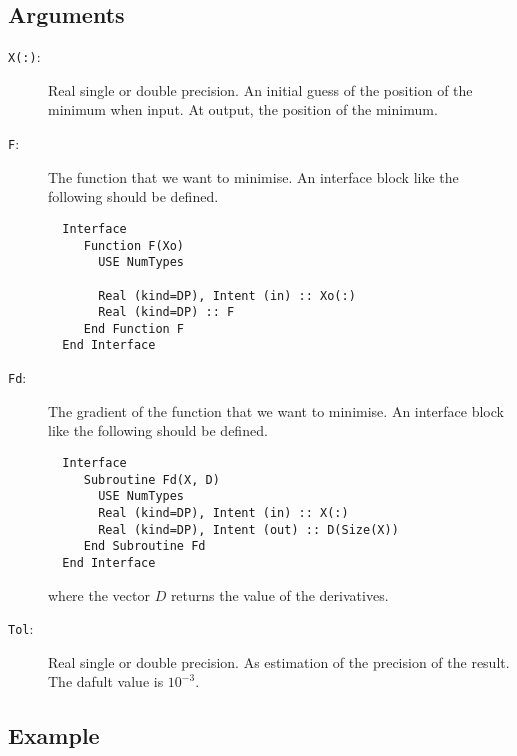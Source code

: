 \subsection{Arguments}

\begin{description}
\item[\texttt{X(:)}:] Real single or double precision. An initial guess
  of the position of the minimum when input. At output, the position
  of the minimum.
\item[\texttt{F}:]  The function that we want to minimise. 
  An interface block like the following should be defined.
\begin{verbatim}
  Interface
     Function F(Xo)
       USE NumTypes
       
       Real (kind=DP), Intent (in) :: Xo(:)
       Real (kind=DP) :: F
     End Function F
  End Interface
\end{verbatim}

\item[\texttt{Fd}:]  The gradient of the function that we want to minimise. 
  An interface block like the following should be defined.
\begin{verbatim}
  Interface 
     Subroutine Fd(X, D)
       USE NumTypes
       Real (kind=DP), Intent (in) :: X(:)
       Real (kind=DP), Intent (out) :: D(Size(X))
     End Subroutine Fd
  End Interface
\end{verbatim}
where the vector $D$ returns the value of the derivatives.

\item[\texttt{Tol}:] Real single or double precision. As estimation of
  the precision of the result. The dafult value is $10^{-3}$.
  
\end{description}

\subsection{Example}

